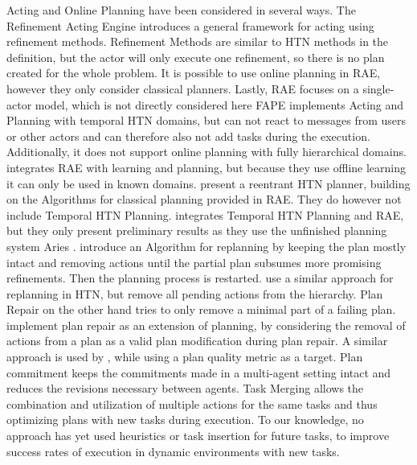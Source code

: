 Acting and Online Planning have been considered in several ways.
The Refinement Acting Engine \citep{ghallabAutomatedPlanningActing2016} introduces a general framework for acting using refinement methods.
Refinement Methods are similar to HTN methods in the definition, but the actor will only execute one refinement, so there is no plan created for the whole problem.
It is possible to use online planning in RAE, however they only consider classical planners. 
Lastly, RAE focuses on a single-actor model, which is not directly considered here
FAPE \citep{bit-monnotTemporalHierarchicalModels2016a} implements Acting and Planning with temporal HTN domains, but can not react to messages from users or other actors and can therefore also not add tasks during the execution.
Additionally, it does not support online planning with fully hierarchical domains.
\cite{patraIntegratingActingPlanning2020} integrates RAE with learning and planning, but because they use offline learning it can only be used in known domains.
\cite{bansodIntegratingPlanningActing2021} present a reentrant HTN planner, building on the Algorithms for classical planning provided in RAE.
They do however not include Temporal HTN Planning.
\cite{turiGuidanceRefinementbasedActing2022} integrates Temporal HTN Planning and RAE, but they only present preliminary results as they use the unfinished planning system Aries \citep{bit-monnotAries2024}.
\cite{boellaReplanningAlgorithmReactive2002} introduce an Algorithm for replanning by keeping the plan mostly intact and removing actions until the partial plan subsumes more promising refinements. Then the planning process is restarted.
\cite{bansodHTNReplanningMiddle2022} use a similar approach for replanning in HTN, but remove all pending actions from the hierarchy.
Plan Repair on the other hand tries to only remove a minimal part of a failing plan.
\cite{vanderkrogtPlanRepairExtension2005} implement plan repair as an extension of planning, by considering the removal of actions from a plan as a valid plan modification during plan repair.
A similar approach is used by \cite{bajadaTemporalPlanQuality2014}, while using a plan quality metric as a target.
Plan commitment \citep{babliPlanCommitmentReplanning2023} keeps the commitments made in a multi-agent setting intact and reduces the revisions necessary between agents.
Task Merging \citep{stockOnlineTaskMerging2015} allows the combination and utilization of multiple actions for the same tasks and thus optimizing plans with new tasks during execution.
To our knowledge, no approach has yet used heuristics or task insertion for future tasks, to improve success rates of execution in dynamic environments with new tasks.
